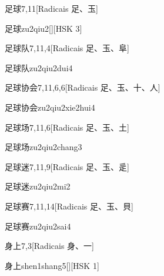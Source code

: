 \begin{entry}{足球}{7,11}[Radicais ⾜、⽟]
  \begin{phonetics}{足球}{zu2qiu2}[][HSK 3]
  \end{phonetics}
\end{entry}

\begin{entry}{足球队}{7,11,4}[Radicais ⾜、⽟、⾩]
  \begin{phonetics}{足球队}{zu2qiu2dui4}
  \end{phonetics}
\end{entry}

\begin{entry}{足球协会}{7,11,6,6}[Radicais ⾜、⽟、⼗、⼈]
  \begin{phonetics}{足球协会}{zu2qiu2xie2hui4}
  \end{phonetics}
\end{entry}

\begin{entry}{足球场}{7,11,6}[Radicais ⾜、⽟、⼟]
  \begin{phonetics}{足球场}{zu2qiu2chang3}
  \end{phonetics}
\end{entry}

\begin{entry}{足球迷}{7,11,9}[Radicais ⾜、⽟、⾡]
  \begin{phonetics}{足球迷}{zu2qiu2mi2}
  \end{phonetics}
\end{entry}

\begin{entry}{足球赛}{7,11,14}[Radicais ⾜、⽟、⾙]
  \begin{phonetics}{足球赛}{zu2qiu2sai4}
  \end{phonetics}
\end{entry}

\begin{entry}{身上}{7,3}[Radicais ⾝、⼀]
  \begin{phonetics}{身上}{shen1shang5}[][HSK 1]
  \end{phonetics}
\end{entry}

